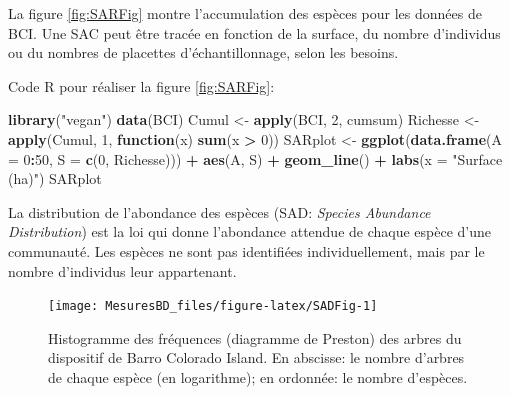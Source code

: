 \documentclass[
  11pt,
  french,
  a4paper,
  extrafontsizes,onecolumn,openright
  ]{memoir}
\newenvironment{Shaded}{\begin{snugshade}}{\end{snugshade}}
\newcommand{\ControlFlowTok}[1]{\textcolor[rgb]{0.13,0.29,0.53}{\textbf{#1}}}
\newcommand{\DataTypeTok}[1]{\textcolor[rgb]{0.13,0.29,0.53}{#1}}
\newcommand{\DecValTok}[1]{\textcolor[rgb]{0.00,0.00,0.81}{#1}}
\newcommand{\KeywordTok}[1]{\textcolor[rgb]{0.13,0.29,0.53}{\textbf{#1}}}
\newcommand{\NormalTok}[1]{#1}
\newcommand{\OperatorTok}[1]{\textcolor[rgb]{0.81,0.36,0.00}{\textbf{#1}}}
\newcommand{\StringTok}[1]{\textcolor[rgb]{0.31,0.60,0.02}{#1}}
\newlength{\rf}
\begin{document}
La figure \ref{fig:SARFig} montre l'accumulation des espèces pour les données de BCI.
Une SAC peut être tracée en fonction de la surface, du nombre d'individus ou du nombres de placettes d'échantillonnage, selon les besoins.

Code R pour réaliser la figure \ref{fig:SARFig}:

\scriptsize

\begin{Shaded}
\begin{Highlighting}[]
\KeywordTok{library}\NormalTok{(}\StringTok{"vegan"}\NormalTok{)}
\KeywordTok{data}\NormalTok{(BCI)}
\NormalTok{Cumul <-}\StringTok{ }\KeywordTok{apply}\NormalTok{(BCI, }\DecValTok{2}\NormalTok{, cumsum)}
\NormalTok{Richesse <-}\StringTok{ }\KeywordTok{apply}\NormalTok{(Cumul, }\DecValTok{1}\NormalTok{, }\ControlFlowTok{function}\NormalTok{(x) }\KeywordTok{sum}\NormalTok{(x }\OperatorTok{>}\StringTok{ }\DecValTok{0}\NormalTok{))}
\NormalTok{SARplot <-}\StringTok{ }\KeywordTok{ggplot}\NormalTok{(}\KeywordTok{data.frame}\NormalTok{(}\DataTypeTok{A =} \DecValTok{0}\OperatorTok{:}\DecValTok{50}\NormalTok{, }
                             \DataTypeTok{S =} \KeywordTok{c}\NormalTok{(}\DecValTok{0}\NormalTok{, Richesse))) }\OperatorTok{+}
\StringTok{  }\KeywordTok{aes}\NormalTok{(A, S) }\OperatorTok{+}
\StringTok{  }\KeywordTok{geom_line}\NormalTok{() }\OperatorTok{+}
\StringTok{  }\KeywordTok{labs}\NormalTok{(}\DataTypeTok{x =} \StringTok{"Surface (ha)"}\NormalTok{)}
\NormalTok{SARplot}
\end{Highlighting}
\end{Shaded}

\normalsize

La distribution de l'abondance des espèces (SAD: \emph{Species Abundance Distribution}) est la loi qui donne l'abondance attendue de chaque espèce d'une communauté.
Les espèces ne sont pas identifiées individuellement, mais par le nombre d'individus leur appartenant.



\scriptsize

\begin{figure}

{\centering \texttt{[image: MesuresBD\_files/figure-latex/SADFig-1]} 

}

\caption{Histogramme des fréquences (diagramme de Preston) des arbres du dispositif de Barro Colorado Island. En abscisse: le nombre d'arbres de chaque espèce (en logarithme); en ordonnée: le nombre d'espèces.}\label{fig:SADFig}
\end{figure}
\end{document}
